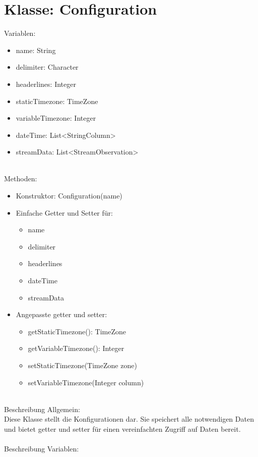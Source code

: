 
\section{Klasse: Configuration}
Variablen:

\begin{itemize}
	\item name: String
	\item delimiter: Character
	\item headerlines: Integer
	\item staticTimezone: TimeZone
	\item variableTimezone: Integer
	\item dateTime: List<StringColumn>
 	\item streamData: List<StreamObservation>
\end{itemize}
\ \\
Methoden:
\begin{itemize}
	\item Konstruktor: Configuration(name)
	\item Einfache Getter und Setter für:
	\begin{itemize}
		\item name
		\item delimiter
		\item headerlines
		\item dateTime
		\item streamData
	\end{itemize}

	\item Angepasste getter und setter:
	\begin{itemize}
		\item getStaticTimezone(): TimeZone
		\item getVariableTimezone(): Integer
		\item setStaticTimezone(TimeZone zone)
		\item setVariableTimezone(Integer column)
	\end{itemize}
\end{itemize}
\ \\
Beschreibung Allgemein: \\Diese Klasse stellt die Konfigurationen dar. Sie speichert
alle notwendigen Daten und bietet getter und setter für einen vereinfachten Zugriff auf Daten bereit.\\
\ \\
Beschreibung Variablen:
